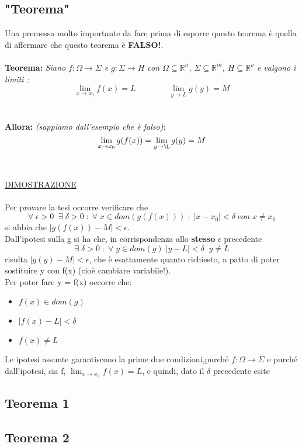 \documentclass[fontsize = 20px, paper = a4]{article}
\begin{document}
\subsection{"Teorema"}
Una premessa molto importante da fare prima di esporre questo teorema è quella di affermare che questo teorema è \textbf{FALSO!}. \\  \\ 
\textbf{Teorema: }\emph{Siano $f : \Omega \to \Sigma$ e $g : \Sigma \to H$ con $\Omega \subseteq \mathbb{R}^n$, $\Sigma \subseteq \mathbb{R}^m$, $H \subseteq \mathbb{R}^\rho$ e \hspace*{1.85cm}valgono i limiti :}
 $$\lim_{x \to x_0}f(x) = L \qquad \qquad \lim_{y \to L}g(y) = M$$
\\ \\
\textbf{Allora: } \emph{(sappiamo dall'esempio che è falso)}:
$$\lim_{x \to x_0}g(f(x)) = \lim_{y \to \L}g(y) = M$$ \\ \\
\underline{DIMOSTRAZIONE} \\ \\
Per provare la tesi occorre verificare che 
$$\forall \; \epsilon > 0 \; \; \exists\;\delta > 0 \; : \;\forall \; x \in dom(g(f(x))) \; : \; |x - x_0| < \delta \; con \; x \neq x_0$$
si abbia che $|g(f(x))- M| < \epsilon $. \\ 
Dall'ipotesi sulla g si ha che, in corrispondenza allo \textbf{stesso} $\epsilon$ precedente
$$\exists \; \delta > 0 \; : \; \forall \; y \in dom(g) \;|y-L| < \delta \;\; y \neq L $$
risulta $|g(y)-M|<\epsilon$, che è esattamente quanto richiesto, a patto di poter sostituire y con f(x) (cioè cambiare variabile!). \\
Per poter fare y = f(x) occorre che:
\begin{itemize}
\item $f(x) \in dom(g)$
\item $|f(x) - L| < \delta$
\item $f(x) \neq L$
\end{itemize}
Le ipotesi assunte garantiscono la prime due condizioni,purché $f:\Omega \to \Sigma$ e purché dall'ipotesi, sia f, $\lim_{x \to x_0}f(x) = L$, e quindi, dato il $\delta$ precedente esite
\subsection{Teorema 1}
\subsection{Teorema 2}
\end{document}
